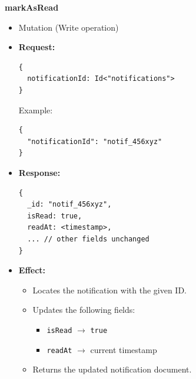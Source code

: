 \documentclass[a4paper,12pt]{article}
\begin{document}
\item \textbf{markAsRead}
  \begin{itemize}
    \item Mutation (Write operation)
    \item \textbf{Request:}
    \begin{verbatim}
{
  notificationId: Id<"notifications">
}
    \end{verbatim}
    Example:
    \begin{verbatim}
{
  "notificationId": "notif_456xyz"
}
    \end{verbatim}
    \item \textbf{Response:}
    \begin{verbatim}
{
  _id: "notif_456xyz",
  isRead: true,
  readAt: <timestamp>,
  ... // other fields unchanged
}
    \end{verbatim}
    \item \textbf{Effect:}
    \begin{itemize}
      \item Locates the notification with the given ID.
      \item Updates the following fields:
        \begin{itemize}
          \item \texttt{isRead} $\rightarrow$ \texttt{true}
          \item \texttt{readAt} $\rightarrow$ current timestamp
        \end{itemize}
      \item Returns the updated notification document.
    \end{itemize}
  \end{itemize}
\end{document}
